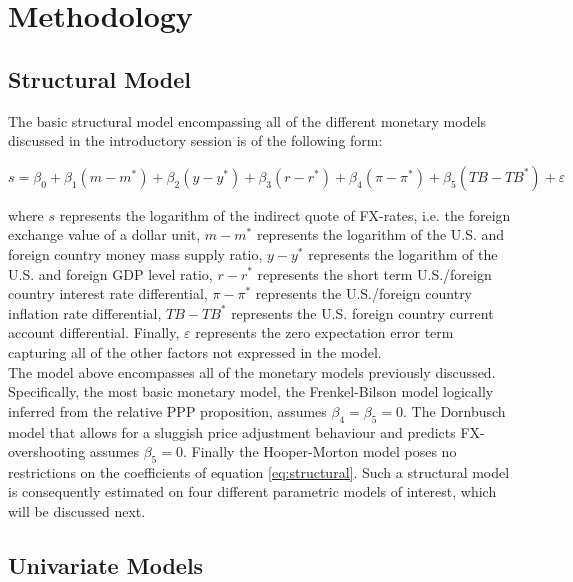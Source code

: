\section{Methodology}
\label{sec:part2}

\subsection{Structural Model}

The basic structural model encompassing all of the different monetary models
discussed in the introductory session is of the following form:

\begin{equation} \label{eq:structural}
  s = \beta_{0} + \beta_{1}(m - m^{*}) + \beta_{2}(y-y^{*}) + \beta_{3}(r-r^{*})
  + \beta_{4}(\pi - \pi^{*}) + \beta_{5}(TB - TB^{*}) + \varepsilon
\end{equation}

where $s$ represents the logarithm of the indirect quote of FX-rates, i.e. the
foreign exchange value of a dollar unit, $m-m^{*}$ represents the logarithm of
the U.S. and foreign country money mass supply ratio, $y-y^{*}$ represents the logarithm
of the U.S. and foreign GDP level ratio, $r-r^{*}$ represents the short term U.S./foreign country
interest rate differential, $\pi - \pi^{*}$ represents the U.S./foreign country inflation
rate differential, $TB - TB^{*}$ represents the U.S. foreign country current account differential.
Finally, $\varepsilon$ represents the zero expectation error term capturing all of the
other factors not expressed in the model.\\
The model above encompasses all of the monetary models previously discussed. Specifically, the most basic monetary model, the Frenkel-Bilson model logically inferred from
the relative PPP proposition, assumes $\beta_{4} = \beta_{5} = 0$. The Dornbusch model that allows for
a sluggish price adjustment behaviour and predicts FX-overshooting
assumes $\beta_{5} = 0$. Finally the Hooper-Morton model poses no restrictions on
the coefficients of equation \ref{eq:structural}. Such a structural model is consequently
estimated on four different parametric models of interest, which will be discussed next.

\subsection{Univariate Models}
\label{sub:univariate}

